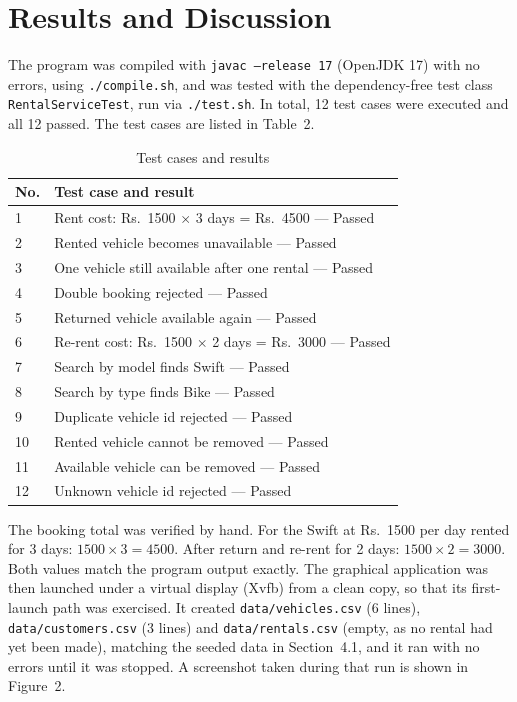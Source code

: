 \documentclass[11pt,a4paper]{article}
\begin{document}
\section{Results and Discussion}

The program was compiled with \texttt{javac --release 17}
(OpenJDK 17) with no errors, using \texttt{./compile.sh}, and was
tested with the dependency-free test class
\texttt{RentalServiceTest}, run via \texttt{./test.sh}. In total,
12 test cases were executed and all 12 passed. The test cases are
listed in Table~2.

\begin{table}[h]
\centering
\caption{Test cases and results}
\begin{tabular}{ll}
\toprule
No. & Test case and result \\
\midrule
1 & Rent cost: Rs.\ 1500 $\times$ 3 days = Rs.\ 4500 --- Passed \\
2 & Rented vehicle becomes unavailable --- Passed \\
3 & One vehicle still available after one rental --- Passed \\
4 & Double booking rejected --- Passed \\
5 & Returned vehicle available again --- Passed \\
6 & Re-rent cost: Rs.\ 1500 $\times$ 2 days = Rs.\ 3000 --- Passed \\
7 & Search by model finds Swift --- Passed \\
8 & Search by type finds Bike --- Passed \\
9 & Duplicate vehicle id rejected --- Passed \\
10 & Rented vehicle cannot be removed --- Passed \\
11 & Available vehicle can be removed --- Passed \\
12 & Unknown vehicle id rejected --- Passed \\
\bottomrule
\end{tabular}
\end{table}

The booking total was verified by hand. For the Swift at
Rs.\ 1500 per day rented for 3 days: $1500 \times 3 = 4500$.
After return and re-rent for 2 days: $1500 \times 2 = 3000$.
Both values match the program output exactly. The graphical
application was then launched under a virtual display (Xvfb) from
a clean copy, so that its first-launch path was exercised. It
created \texttt{data/vehicles.csv} (6 lines),
\texttt{data/customers.csv} (3 lines) and
\texttt{data/rentals.csv} (empty, as no rental had yet been made),
matching the seeded data in Section~4.1, and it ran with no errors
until it was stopped. A screenshot taken during that run is shown
in Figure~2.
\end{document}
